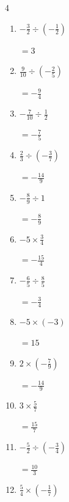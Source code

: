 \begin{multicols}{4}
\begin{enumerate}
        $\displaystyle =-\frac{3}{40}$

  \item $\displaystyle -\frac{3}{2}\div{}\left(-\frac{1}{2}\right)$

        $\displaystyle =3$

\columnbreak %

  \item $\displaystyle \frac{9}{10}\div{}\left(-\frac{2}{5}\right)$

        $\displaystyle =-\frac{9}{4}$

  \item $\displaystyle -\frac{7}{10}\div{}\frac{1}{2}$

        $\displaystyle =-\frac{7}{5}$

  \item $\displaystyle \frac{2}{3}\div{}\left(-\frac{3}{7}\right)$

        $\displaystyle =-\frac{14}{9}$

  \item $\displaystyle -\frac{8}{9}\div{}1$

        $\displaystyle =-\frac{8}{9}$

  \item $\displaystyle -5\times{}\frac{3}{4}$

        $\displaystyle =-\frac{15}{4}$

  \item $\displaystyle -\frac{6}{5}\div{}\frac{8}{5}$

        $\displaystyle =-\frac{3}{4}$

  \item $\displaystyle -5\times{}\left(-3\right)$

        $\displaystyle =15$

  \item $\displaystyle 2\times{}\left(-\frac{7}{9}\right)$

        $\displaystyle =-\frac{14}{9}$

  \item $\displaystyle 3\times{}\frac{5}{7}$

        $\displaystyle =\frac{15}{7}$

  \item $\displaystyle -\frac{5}{2}\div{}\left(-\frac{3}{4}\right)$

        $\displaystyle =\frac{10}{3}$

\columnbreak %

  \item $\displaystyle \frac{5}{4}\times{}\left(-\frac{1}{7}\right)$


\end{enumerate}
\end{multicols}
